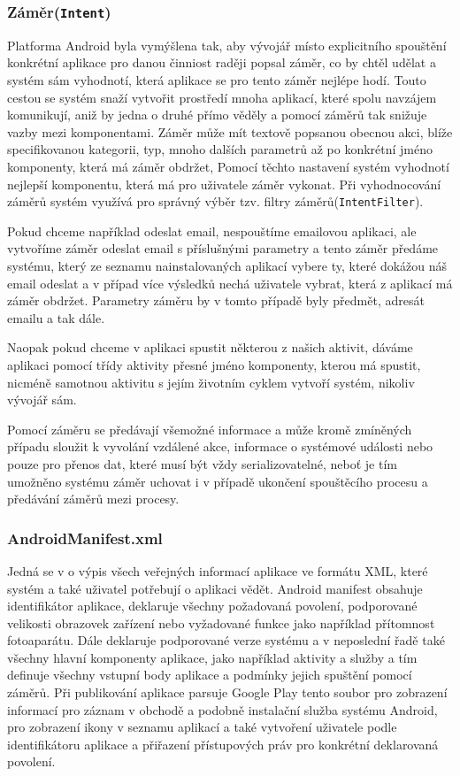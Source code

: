 \documentclass{article}
\begin{document}
\subsubsection{Záměr(\texttt{Intent})}
Platforma Android byla vymýšlena tak, aby vývojář místo explicitního spouštění konkrétní aplikace pro danou činniost
raději popsal záměr, co by chtěl udělat a systém sám vyhodnotí, která aplikace se pro tento záměr nejlépe
hodí. Touto cestou se systém snaží vytvořit prostředí mnoha aplikací, které spolu navzájem komunikují,
aniž by jedna o druhé přímo věděly a pomocí záměrů tak snižuje vazby mezi komponentami. Záměr může mít
textově popsanou obecnou akci, blíže specifikovanou kategorii, typ, mnoho dalších parametrů až po konkrétní
jméno komponenty, která má záměr obdržet, Pomocí těchto nastavení systém vyhodnotí nejlepší komponentu,
která má pro uživatele záměr vykonat. Při vyhodnocování záměrů systém využívá pro správný výběr
 tzv. filtry záměrů(\texttt{IntentFilter}).

Pokud chceme například odeslat email, nespouštíme emailovou aplikaci, ale vytvoříme záměr odeslat email
s příslušnými parametry a tento záměr předáme systému, který ze seznamu nainstalovaných aplikací vybere
ty, které dokážou náš email odeslat a v případ více výsledků nechá uživatele vybrat, která z aplikací
má záměr obdržet. Parametry záměru by v tomto případě byly předmět, adresát emailu a tak dále.

Naopak pokud chceme v aplikaci spustit některou z našich aktivit, dáváme aplikaci pomocí třídy
aktivity přesné jméno komponenty, kterou má spustit, nicméně samotnou aktivitu s jejím životním
cyklem vytvoří systém, nikoliv vývojář sám.

Pomocí záměru se předávají všemožné informace a může kromě zmíněných případu sloužit k vyvolání
vzdálené akce, informace o systémové události nebo pouze pro přenos dat, které musí být vždy
serializovatelné, neboť je tím umožněno systému záměr uchovat i v případě ukončení spouštěcího
procesu a předávání záměrů mezi procesy.

\subsubsection{AndroidManifest.xml}
Jedná se v o výpis všech veřejných informací aplikace ve formátu XML, které systém
a také uživatel potřebují o aplikaci vědět. Android manifest obsahuje identifikátor aplikace, deklaruje všechny
požadovaná povolení, podporované velikosti obrazovek zařízení nebo vyžadované funkce jako například přítomnost
fotoaparátu. Dále deklaruje podporované verze systému a v neposlední řadě také všechny hlavní komponenty
aplikace, jako například aktivity a služby a tím definuje všechny vstupní body aplikace a podmínky
jejich spuštění pomocí záměrů. Při publikování aplikace
parsuje Google Play tento soubor pro zobrazení informací pro záznam v obchodě a podobně instalační služba
systému Android, pro zobrazení ikony v seznamu aplikací a také vytvoření uživatele podle identifikátoru
aplikace a přiřazení přístupových práv pro konkrétní deklarovaná povolení.
\end{document}
